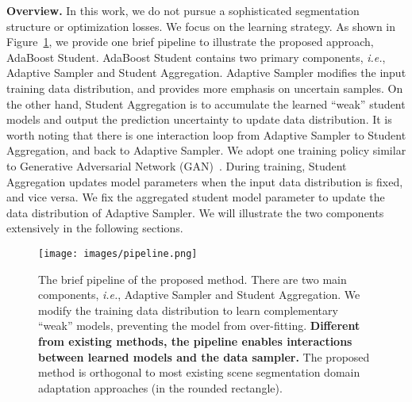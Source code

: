 \documentclass[journal]{IEEEtran}
\def\ie{\emph{i.e.}}
\begin{document}
\noindent\textbf{Overview.} In this work, we do not pursue a sophisticated segmentation structure or optimization losses. We focus on the learning strategy. As shown in Figure~\ref{fig:pipeline}, we provide one brief pipeline to illustrate the proposed approach, AdaBoost Student.  AdaBoost Student contains two primary components, \ie, Adaptive Sampler and Student Aggregation. Adaptive Sampler modifies the input training data distribution, and provides more emphasis on uncertain samples. On the other hand, Student Aggregation is to accumulate the learned ``weak'' student models and output the prediction uncertainty to update data distribution. It is worth noting that there is one interaction loop from Adaptive Sampler to Student Aggregation, and back to Adaptive Sampler. 
We adopt one training policy similar to Generative Adversarial Network (GAN)~\cite{goodfellow2014generative}.
During training, Student Aggregation updates model parameters when the input data distribution is fixed, and vice versa. We fix the aggregated student model parameter to update the data distribution of Adaptive Sampler.  We will illustrate the two components extensively in the following sections. 

\begin{figure}[t]
\begin{center}
\texttt{[image: images/pipeline.png]}
\end{center}
\vspace{-.2in}
   \caption{ The brief pipeline of the proposed method. There are two main components, \ie, Adaptive Sampler and Student Aggregation. We modify the training data distribution to learn complementary ``weak'' models, preventing the model from over-fitting. \textbf{Different from existing methods, the pipeline enables interactions between learned models and the data sampler. } The proposed method is orthogonal to most existing scene segmentation domain adaptation approaches (in the rounded rectangle). }
\label{fig:pipeline}
\end{figure}
\end{document}
